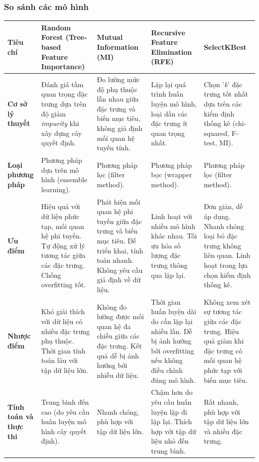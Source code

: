 \documentclass[13pt]{article}
\begin{document}
\subsubsection{So sánh các mô hình}
\begin{table}[h!]
\centering
\begin{tabular}{|p{2cm}|p{3cm}|p{3cm}|p{3cm}|p{3cm}|}
\hline
\textbf{Tiêu chí} & \textbf{Random Forest (Tree-based Feature Importance)} & \textbf{Mutual Information (MI)} & \textbf{Recursive Feature Elimination (RFE)} & \textbf{SelectKBest} \\ 
\hline
\textbf{Cơ sở lý thuyết} & Đánh giá tầm quan trọng đặc trưng dựa trên độ giảm \textit{impurity} khi xây dựng cây quyết định.  & Đo lường mức độ phụ thuộc lẫn nhau giữa đặc trưng và biến mục tiêu, không giả định mối quan hệ tuyến tính. & Lặp lại quá trình huấn luyện mô hình, loại dần các đặc trưng ít quan trọng nhất. & Chọn '\textit{k}' đặc trưng tốt nhất dựa trên các kiểm định thống kê (chi-squared, F-test, MI). \\ 
\hline
\textbf{Loại phương pháp} & Phương pháp dựa trên mô hình (ensemble learning). & Phương pháp lọc (filter method). & Phương pháp bọc (wrapper method). & Phương pháp lọc (filter method).\\ 
\hline
\textbf{Ưu điểm} & Hiệu quả với dữ liệu phức tạp, mối quan hệ phi tuyến. Tự động xử lý tương tác giữa các đặc trưng. Chống overfitting tốt. & Phát hiện mối quan hệ phi tuyến giữa đặc trưng và biến mục tiêu. Dễ triển khai, tính toán nhanh. Không yêu cầu giả định về dữ liệu. & Linh hoạt với nhiều mô hình khác nhau. Tối ưu hóa số lượng đặc trưng thông qua lặp lại. & Đơn giản, dễ áp dụng. Nhanh chóng loại bỏ đặc trưng không liên quan. Linh hoạt trong lựa chọn kiểm định thống kê. \\ 
\hline
\textbf{Nhược điểm} & Khó giải thích với dữ liệu có nhiều đặc trưng phụ thuộc. Thời gian tính toán lâu với tập dữ liệu lớn. & Không đo lường được mối quan hệ đa chiều giữa các đặc trưng. Kết quả dễ bị ảnh hưởng bởi nhiễu dữ liệu. & Thời gian huấn luyện dài do cần lặp lại nhiều lần. Dễ bị ảnh hưởng bởi overfitting nếu không điều chỉnh đúng mô hình. & Không xem xét sự tương tác giữa các đặc trưng. Hiệu quả giảm khi đặc trưng có mối quan hệ phức tạp với biến mục tiêu. \\ 
\hline
\textbf{Tính toán và thực thi} & Trung bình đến cao (do yêu cầu huấn luyện mô hình cây quyết định). & Nhanh chóng, phù hợp với tập dữ liệu lớn. & Chậm hơn do yêu cầu huấn luyện lặp đi lặp lại. Thích hợp với tập dữ liệu nhỏ đến trung bình. & Rất nhanh, phù hợp với tập dữ liệu lớn và nhiều đặc trưng.\\ 

\end{tabular}
\end{table}
\end{document}
